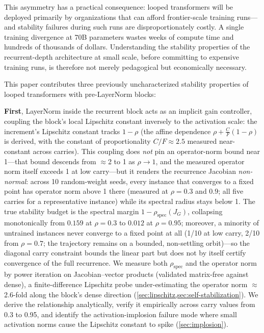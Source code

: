 \documentclass[11pt]{article}
\begin{document}
This asymmetry has a practical consequence: looped transformers will be deployed primarily by organizations that can afford frontier-scale training runs---and stability failures during such runs are disproportionately costly. A single training divergence at 70B parameters wastes weeks of compute time and hundreds of thousands of dollars. Understanding the stability properties of the recurrent-depth architecture at small scale, before committing to expensive training runs, is therefore not merely pedagogical but economically necessary.

This paper contributes three previously uncharacterized stability properties of looped transformers with pre-LayerNorm blocks:

\textbf{First}, LayerNorm inside the recurrent block acts as an implicit gain controller, coupling the block's local Lipschitz constant inversely to the activation scale: the increment's Lipschitz constant tracks $1-\rho$ (the affine dependence $\rho + \tfrac{C}{F}(1-\rho)$ is derived, with the constant of proportionality $C/F \approx 2.5$ measured near-constant across carries). This coupling does \emph{not} pin an operator-norm bound near 1---that bound descends from $\approx$2 to 1 as $\rho \to 1$, and the measured operator norm itself exceeds 1 at low carry---but it renders the recurrence Jacobian \emph{non-normal}: across 10 random-weight seeds, every instance that converges to a fixed point has operator norm above 1 there (measured at $\rho = 0.3$ and $0.9$; all five carries for a representative instance) while its spectral radius stays below 1. The true stability budget is the spectral margin $1-\rho_{\text{spec}}(J_G)$, collapsing monotonically from $0.159$ at $\rho = 0.3$ to $0.012$ at $\rho = 0.95$; moreover, a minority of untrained instances never converge to a fixed point at all (1/10 at low carry, 2/10 from $\rho = 0.7$; the trajectory remains on a bounded, non-settling orbit)---so the diagonal carry constraint bounds the linear part but does not by itself certify convergence of the full recurrence. We measure both $\rho_{\text{spec}}$ and the operator norm by power iteration on Jacobian--vector products (validated matrix-free against dense), a finite-difference Lipschitz probe under-estimating the operator norm $\approx$2.6-fold along the block's dense direction (\cref{sec:lipschitz,sec:self-stabilization}). We derive the relationship analytically, verify it empirically across carry values from 0.3 to 0.95, and identify the activation-implosion failure mode where small activation norms cause the Lipschitz constant to spike (\cref{sec:implosion}).
\end{document}
